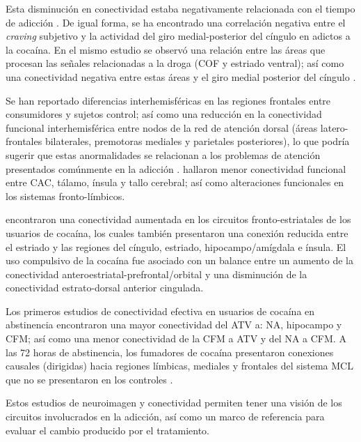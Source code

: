 Esta disminución en conectividad estaba negativamente relacionada con el tiempo de adicción \parencite{Gu2010}.
De igual forma, se ha encontrado una correlación negativa entre el \textit{craving} subjetivo y la actividad del giro medial-posterior del cíngulo en adictos a la cocaína.
En el mismo estudio se observó una relación entre las áreas que procesan las señales relacionadas a la droga (COF y estriado ventral);
así como una conectividad negativa entre estas áreas y el giro medial posterior del cíngulo \parencite{Wilcox2011}.\par
Se han reportado diferencias interhemisféricas en las regiones frontales entre consumidores y sujetos control; así como una reducción en la conectividad funcional interhemisférica entre nodos de la red de atención dorsal (áreas latero-frontales bilaterales, premotoras mediales y parietales posteriores), lo que podría sugerir que estas anormalidades se relacionan a los problemas de atención presentados comúnmente en la adicción \parencite{Kelly2011a}.
\textcite{Verdejo-Garcia2014} hallaron menor conectividad funcional entre CAC, tálamo, ínsula y tallo cerebral; así como alteraciones funcionales en los sistemas fronto-límbicos.\par
\textcite{Hu2015} encontraron una conectividad aumentada en los circuitos fronto-estriatales de los usuarios de cocaína, los cuales también presentaron una conexión reducida entre el estriado y las regiones del cíngulo, estriado, hipocampo/amígdala e ínsula. El uso compulsivo de la cocaína fue asociado con un balance entre un aumento de la conectividad anteroestriatal-prefrontal/orbital y una disminución de la conectividad estrato-dorsal anterior cingulada.\par
Los primeros estudios de conectividad efectiva en usuarios de cocaína en abstinencia encontraron una mayor conectividad del ATV a: NA, hipocampo y CFM; así como una menor conectividad de la CFM a ATV y del NA a CFM.
A las 72 horas de abstinencia, los fumadores de cocaína presentaron conexiones causales (dirigidas) hacia regiones límbicas, mediales y frontales del sistema MCL que no se presentaron en los controles \parencite{Ray2017,Ray2016}.\par
Estos estudios de neuroimagen y conectividad permiten tener una visión de los circuitos involucrados en la adicción, así como un marco de referencia para evaluar el cambio producido por el tratamiento.

